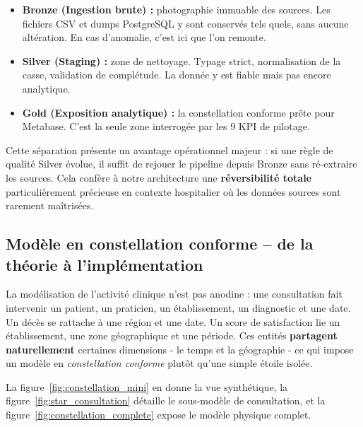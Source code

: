 \documentclass[12pt,a4paper]{report}
\begin{document}
\begin{infobox}
\begin{itemize}
    \item \textbf{Bronze (Ingestion brute) :} photographie immuable des sources. Les fichiers CSV et dumps PostgreSQL y sont conservés tels quels, sans aucune altération. En cas d'anomalie, c'est ici que l'on remonte.
    \item \textbf{Silver (Staging) :} zone de nettoyage. Typage strict, normalisation de la casse, validation de complétude. La donnée y est fiable mais pas encore analytique.
    \item \textbf{Gold (Exposition analytique) :} la constellation conforme prête pour Metabase. C'est la seule zone interrogée par les 9 KPI de pilotage.
\end{itemize}
\end{infobox}

Cette séparation présente un avantage opérationnel majeur : si une règle de qualité Silver évolue, il suffit de rejouer le pipeline depuis Bronze sans ré-extraire les sources. Cela confère à notre architecture une \textbf{réversibilité totale} particulièrement précieuse en contexte hospitalier où les données sources sont rarement maîtrisées.

\subsection{Modèle en constellation conforme -- de la théorie à l'implémentation}
La modélisation de l'activité clinique n'est pas anodine : une consultation fait intervenir un patient, un praticien, un établissement, un diagnostic et une date. Un décès se rattache à une région et une date. Un score de satisfaction lie un établissement, une zone géographique et une période. Ces entités \textbf{partagent naturellement} certaines dimensions - le temps et la géographie - ce qui impose un modèle en \textit{constellation conforme} plutôt qu'une simple étoile isolée.

La figure~\ref{fig:constellation_mini} en donne la vue synthétique, la figure~\ref{fig:star_consultation} détaille le sous-modèle de consultation, et la figure~\ref{fig:constellation_complete} expose le modèle physique complet.
\end{document}
